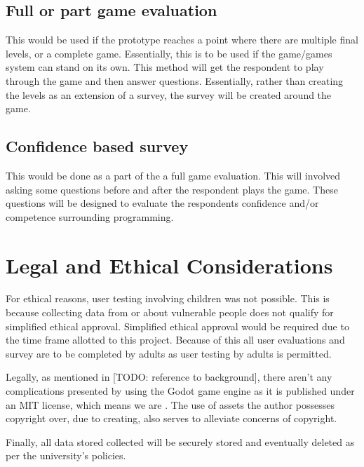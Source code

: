 \subsection{Full or part game evaluation}

This would be used if the prototype reaches a point where there are multiple final levels, or a complete game. Essentially, this is to be used if the game/games system can stand on its own. This method will get the respondent to play through the game and then answer questions. Essentially, rather than creating the levels as an extension of a survey, the survey will be created around the game.

\subsection{Confidence based survey}

This would be done as a part of the a full game evaluation. This will involved asking some questions before and after the respondent plays the game. These questions will be designed to evaluate the respondents confidence and/or competence surrounding programming.

\section{Legal and Ethical Considerations}

For ethical reasons, user testing involving children was not possible. This is because collecting data from or about vulnerable people does not qualify for simplified ethical approval. Simplified ethical approval would be required due to the time frame allotted to this project. Because of this all user evaluations and survey are to be completed by adults as user testing by adults is permitted.

Legally, as mentioned in [TODO: reference to background], there aren't any complications presented by using the Godot game engine as it is published under an MIT license, which means we are  \citep{GodotLis}. The use of assets the author possesses copyright over, due to creating, also serves to alleviate concerns of copyright.

Finally, all data stored collected will be securely stored and eventually deleted as per the university's policies.